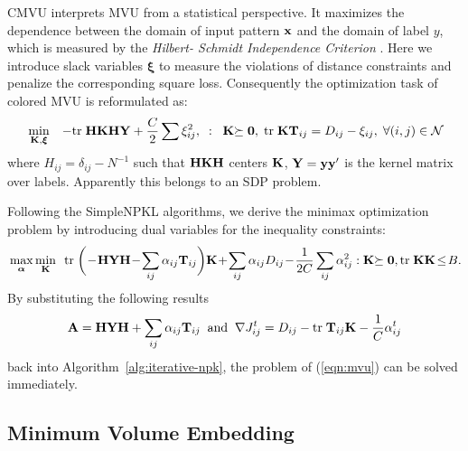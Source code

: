 CMVU interprets MVU from a statistical perspective. It maximizes the dependence
between the domain of input pattern ${\bf x}$ and the domain of label $y$, which is
measured by the {\em Hilbert- Schmidt Independence Criterion}
\cite{alt/GrettonBSS05,nips/SongSBG07}. Here we introduce slack variables
$\bm\xi$ to measure the violations of distance constraints and penalize the
corresponding square loss. Consequently the optimization task of colored MVU is
reformulated as:
\begin{eqnarray}
&\min_{{\bf K}, \boldsymbol{\xi}}& -{\mbox{tr}\;} \mathbf H{\bf K}\mathbf H\mathbf Y + \frac{C}{2} \sum \xi_{ij}^2, \;\;:\;\; {\bf K}{\succeq{\bf 0}}, \; {\mbox{tr}\;}{\bf K}{\bf T}_{ij} = D_{ij} - \xi_{ij}, \; \forall (i,j)\in\mathcal N \nonumber
\end{eqnarray}
where $H_{ij} = \delta_{ij} - N^{-1}$ such that $\mathbf H{\bf K}\mathbf H$ centers
${\bf K}$, $\mathbf Y={\bf y}{\bf y}'$ is the kernel matrix over labels. Apparently this belongs to
an SDP problem.

Following the SimpleNPKL algorithms, we derive the minimax optimization problem
by introducing dual variables for the inequality constraints:
\begin{eqnarray}
&\max_{\ba}\min_{\K}& \!\!\tr\bigg( \!-\! \mathbf H\mathbf Y\mathbf H \!-\! \sum_{ij} \a_{ij}\mathbf T_{ij}\bigg)\K \!+\! \sum_{ij} \a_{ij}D_{ij} \!-\! \frac{1}{2C} \sum_{ij} \a_{ij}^2 : \K\psd, \tr \K\K \!\leq\! B. \nonumber\\
\label{eqn:cmvu}
\end{eqnarray}
By substituting the following results
\[
{\bf A} = \mathbf H\mathbf Y\mathbf H + \sum_{ij}{\alpha}_{ij}{\bf T}_{ij} \;\;\mbox{and}\;\; \nabla J^t_{ij} =   D_{ij} - {\mbox{tr}\;}{\bf T}_{ij}{\bf K}-\frac{1}{C}{\alpha}_{ij}^t
\]
back into Algorithm~\ref{alg:iterative-npk}, the problem of (\ref{eqn:mvu}) can be solved immediately.

\subsection{Minimum Volume Embedding} \label{sec:mve}

